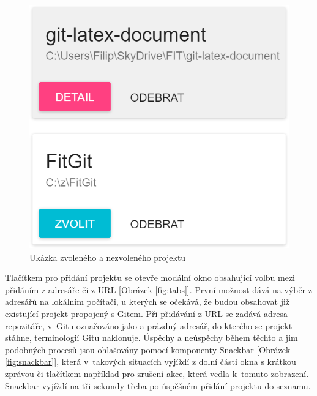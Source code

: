 \FloatBarrier
\begin{figure}[ht]
	\centering
	\includegraphics[scale=0.5]{sections/ui/images/projects.png}
	\caption[Projekty]{Ukázka zvoleného a nezvoleného projektu}
	\label{fig:projects}
\end{figure}
\FloatBarrier

Tlačítkem pro přidání projektu se otevře modální okno obsahující volbu mezi přidáním z adresáře či z URL [Obrázek \ref{fig:tabs}]. První možnost dává na výběr z adresářů na lokálním počítači, u kterých se očekává, že budou obsahovat již existující projekt propojený s Gitem. Při přidávání z URL se zadává adresa repozitáře, v~Gitu označováno jako  a prázdný adresář, do kterého se projekt stáhne, terminologií Gitu naklonuje. Úspěchy a neúspěchy během těchto a jim podobných procesů jsou ohlašovány pomocí komponenty Snackbar [Obrázek \ref{fig:snackbar}], která v~takových situacích vyjíždí z dolní části okna s krátkou zprávou či tlačítkem například pro zrušení akce, která vedla k~tomuto zobrazení. Snackbar vyjíždí na tři sekundy třeba po úspěšném přidání projektu do seznamu.


